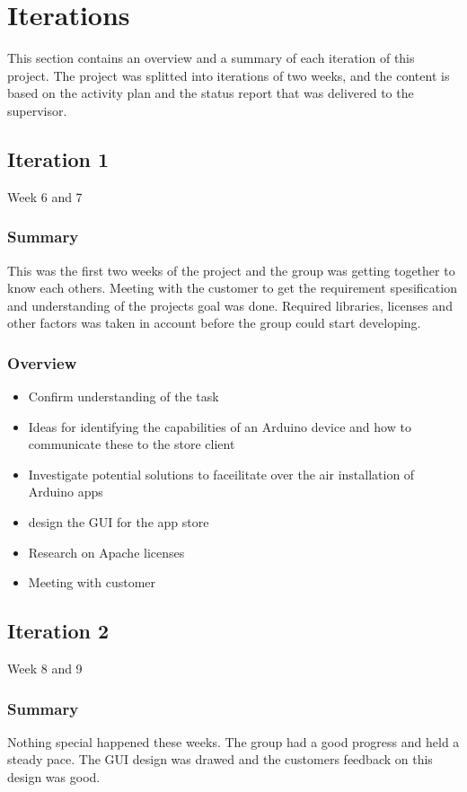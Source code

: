 \chapter{Iterations}

This section contains an overview and a summary of each iteration of this project. The project was splitted into 
iterations of two weeks, and the content is based on the activity plan and the status report that was delivered to the supervisor.

\section{Iteration 1}
Week 6 and 7
\subsection{Summary}
	This was the first two weeks of the project and the group was getting together to know each others.
	Meeting with the customer to get the requirement spesification and understanding of the projects goal was done.
	Required libraries, licenses and other factors was taken in account before the group could start developing.  

\subsection{Overview}
\begin{itemize}
	\item{Confirm understanding of the task}
	\item{Ideas for identifying the capabilities of an Arduino device and how to communicate these to the store client}
	\item{Investigate potential solutions to faceilitate over the air installation of Arduino apps}
	\item{design the GUI for the app store}
	\item{Research on Apache licenses}
	\item{Meeting with customer}
\end{itemize}

\section{Iteration 2}
Week 8 and 9
\subsection{Summary}
	Nothing special happened these weeks. The group had a good progress and held a steady pace. The GUI design was drawed
	and the customers feedback on this design was good.

